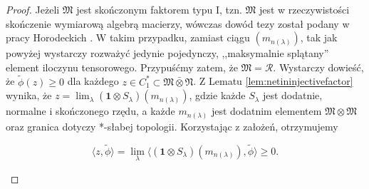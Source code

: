 \begin{proof}
Jeżeli $\mathfrak{M}$ jest skończonym faktorem typu I, tzn. $\mathfrak{M}$ jest
w rzeczywistości skończenie wymiarową algebrą macierzy,
wówczas dowód tezy został podany w pracy Horodeckich
\cite{horodecki1996separability}.
W takim przypadku, zamiast ciągu $(m_{n(\lambda)})$,
tak jak powyżej
wystarczy rozważyć jedynie pojedynczy,
,,maksymalnie splątany'' element iloczynu tensorowego.
Przypuśćmy zatem, że $\mathfrak{M} = \mathcal{R}$.
Wystarczy dowieść, że
$\tilde{\phi}(z) \geq 0$ dla każdego
$z \in C_{1}^{*} \subset \mathfrak{M} \bar{\otimes} \mathfrak{N}$.
Z Lematu \ref{lem:netininjectivefactor} wynika, że
$z = \lim_{\lambda} (\mathbf{1} \otimes S_{\lambda})(m_{n(\lambda)})$,
gdzie każde $S_{\lambda}$
jest dodatnie, normalne i skończonego rzędu,
a każde $m_{n(\lambda)}$ jest dodatnim elementem $\mathfrak{M} \otimes \mathfrak{M}$
oraz granica dotyczy *-słabej topologii.
Korzystając z założeń, otrzymujemy
\begin{linenomath*}
 \begin{equation}
\langle z , \tilde{\phi} \rangle =\lim \limits_{\lambda}
\langle ( \mathbf{1} \otimes S_{\lambda}) (m_{n(\lambda)}), \tilde{\phi}
\rangle \geq 0.
 \end{equation}
\end{linenomath*}
\end{proof}

